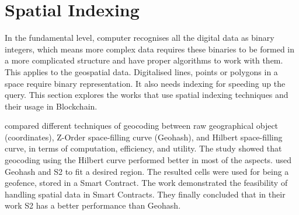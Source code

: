 \section{Spatial Indexing} \label{RelatedWorks-Spatial}

\npara In the fundamental level, computer recognises all the digital data as binary integers, which means more complex data requires these binaries to be formed in a more complicated structure and have proper algorithms to work with them.
This applies to the geospatial data.
Digitalised lines, points or polygons in a space require binary representation.
It also needs indexing for speeding up the query.
This section explores the works that use spatial indexing techniques and their usage in Blockchain.

\npara \cite{SpatioTemporalComparison} compared different techniques of geocoding between raw geographical object (coordinates), Z-Order space-filling curve (Geohash), and Hilbert space-filling curve, in terms of computation, efficiency, and utility.
The study showed that geocoding using the Hilbert curve performed better in most of the aspects.
\cite{GeofencesBlockchain} used Geohash and S2 to fit a desired region.
The resulted cells were used for being a geofence, stored in a Smart Contract.
The work demonstrated the feasibility of handling spatial data in Smart Contracts.
They finally concluded that in their work S2 has a better performance than Geohash.
